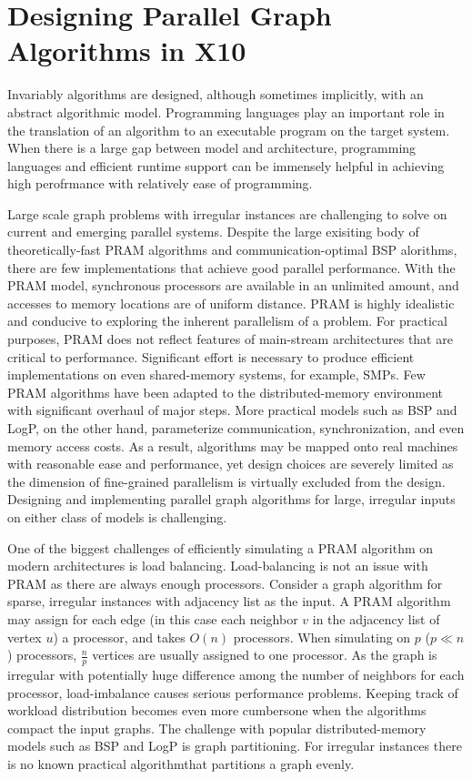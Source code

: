 
\section{Designing Parallel Graph Algorithms in X10}
\label{s:design}

 Invariably algorithms are designed, although sometimes implicitly, with an abstract algorithmic model. Programming languages play an important role in the translation of an algorithm to an executable program on the target system. When there is a large gap between model and architecture, programming languages and efficient runtime support can be immensely helpful in achieving high perofrmance with relatively ease of programming. 

 Large scale graph problems with irregular instances are challenging to solve on current and emerging parallel systems. Despite the large exisiting body of theoretically-fast PRAM algorithms and communication-optimal BSP alorithms, there are few implementations that achieve good parallel performance. With the PRAM model, synchronous processors are available in an unlimited amount, and accesses to memory locations are of uniform distance. PRAM is highly idealistic and conducive to exploring the inherent parallelism of a problem. For practical purposes, PRAM does not reflect features of main-stream architectures that are critical to performance. Significant effort is necessary to produce efficient implementations on even shared-memory systems, for example, SMPs. Few PRAM algorithms have been adapted to the distributed-memory environment with significant overhaul of major steps. More practical models such as BSP and LogP, on the other hand, parameterize communication, synchronization, and even memory access costs. As a result, algorithms may be mapped onto real machines with reasonable ease and performance, yet design choices are severely limited as the dimension of fine-grained parallelism is virtually excluded from the design. Designing and implementing parallel graph algorithms for large, irregular inputs on either class of models is challenging. 

 One of the biggest challenges of efficiently simulating a PRAM algorithm on modern architectures is load balancing. Load-balancing is not an issue with PRAM as there are always enough processors. Consider a graph algorithm for sparse, irregular instances with adjacency list as the input. A PRAM algorithm may assign for each edge (in this case each neighbor $v$ in the adjacency list of vertex $u$) a processor, and takes $O(n)$ processors. When simulating on $p$ ($p\ll n$) processors, $\frac{n}{p}$ vertices are usually assigned to one processor. As the graph is irregular with potentially huge difference among the number of neighbors for each processor, load-imbalance causes serious performance problems. Keeping track of workload distribution becomes even more cumbersone when the algorithms compact the input graphs. The challenge with popular distributed-memory models such as BSP and LogP is graph partitioning. For irregular instances there is no known practical algorithmthat partitions a graph evenly.  

